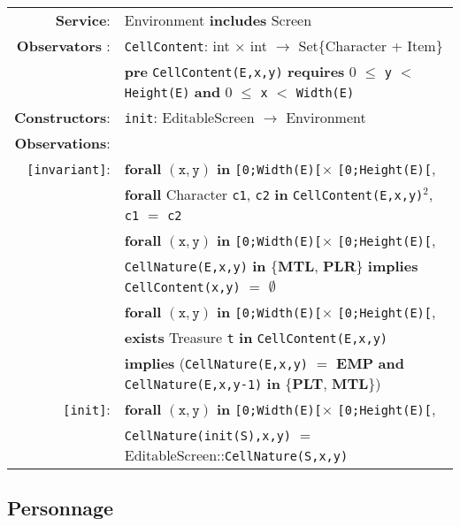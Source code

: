 \documentclass{article}
\begin{document}
\begin{tabular}{rl}
\textbf{Service}: & Environment \textbf{includes} Screen
\\ \textbf{Observators} : & \texttt{CellContent}:
\textrm{int} $\times$ \textrm{int} $\rightarrow$
\textrm{Set\{Character + Item\}} \\
& \quad \textbf{pre } \texttt{CellContent(E,x,y)} \textbf{ requires } 0 $\leq$ \texttt{y} $<$ \texttt{Height(E)} \textbf{ and } 0 $\leq$ \texttt{x} $<$ \texttt{Width(E)}\\
\textbf{Constructors}: & \texttt{init}: \textrm{EditableScreen} $\rightarrow$ \textrm{Environment} \\

\textbf{Observations}: \\
\texttt{[invariant]}: & \textbf{forall} $(\mathtt{x},\mathtt{y})$ \textbf{in} \texttt{[0;Width(E)[}$\times$ \texttt{[0;Height(E)[},~\\ & \quad\quad \textbf{forall} \textrm{Character} \texttt{c1}, \texttt{c2} \textbf{in} \texttt{CellContent(E,x,y)}$^2$, \texttt{c1} $=$ \texttt{c2} \\
& \textbf{forall} $(\mathtt{x},\mathtt{y})$ \textbf{in} \texttt{[0;Width(E)[}$\times$ \texttt{[0;Height(E)[},~\\ & \quad\quad \texttt{CellNature(E,x,y)} \textbf{in} \{\textbf{MTL}, \textbf{PLR}\} \textbf{implies} \texttt{CellContent(x,y)} $=$ $\emptyset$  \\
& \textbf{forall} $(\mathtt{x},\mathtt{y})$ \textbf{in} \texttt{[0;Width(E)[}$\times$ \texttt{[0;Height(E)[},~\\ & \quad\quad \textbf{exists} \textrm{Treasure} \texttt{t} \textbf{in} \texttt{CellContent(E,x,y)}  \\ & \quad\quad \textbf{implies} (\texttt{CellNature(E,x,y)} $=$ \textbf{EMP} \textbf{and} \texttt{CellNature(E,x,y-1)} \textbf{in} \{\textbf{PLT}, \textbf{MTL}\})\\
                        \texttt{[init]}: & \textbf{forall} $(\mathtt{x},\mathtt{y})$ \textbf{in} \texttt{[0;Width(E)[}$\times$ \texttt{[0;Height(E)[},~\\ & \quad\quad
                                \texttt{CellNature(init(S),x,y)} $=$ \textrm{EditableScreen}::\texttt{CellNature(S,x,y)} \\

                        
\end{tabular}


\subsection*{Personnage}
\end{document}
